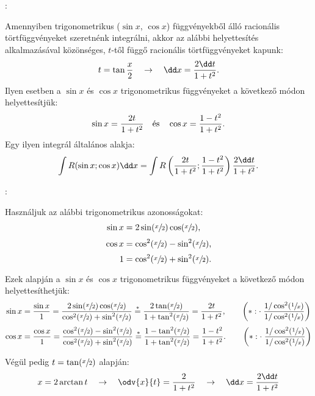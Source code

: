 \documentclass[a4paper, 12pt]{scrartcl}
\begin{document}
\begin{blueBox}
  :

  Amennyiben trigonometrikus ($\sin x$, $\cos x$) függvényekből álló racionális
  törtfüggvényeket szeretnénk integrálni, akkor az alábbi helyettesítés
  alkalmazásával közönséges, $t$-től függő racionális törtfüggvényeket kapunk:
  \[
    t = \tan \frac{x}{2}
    \quad \rightarrow \quad
    \dd x = \frac{2 \dd t}{1 + t^2}
    \text.
  \]
  Ilyen esetben a $\sin x$ és $\cos x$ trigonometrikus függvényeket a következő
  módon helyettesítjük:
  \[
    \sin x = \frac{2t}{1 + t^2}
    \quad \text{és} \quad
    \cos x = \frac{1 - t^2}{1 + t^2}
    \text.
  \]
  Egy ilyen integrál általános alakja:
  \[
    \int R(\sin x; \cos x) \dd x =
    \int R\left(
    \frac{2t}{1 + t^2}; \frac{1 - t^2}{1 + t^2}
    \right) \frac{2 \dd t}{1 + t^2}
    \text.
  \]
\end{blueBox}

\begin{note}
  :

  Használjuk az alábbi trigonometrikus azonosságokat:
  \begin{align*}
    \sin x & = 2 \sin (\sfrac{x}{2}) \cos (\sfrac{x}{2}) \text,     \\[1mm]
    \cos x & = \cos^2 (\sfrac{x}{2}) - \sin^2 (\sfrac{x}{2}) \text, \\[1mm]
    1      & = \cos^2 (\sfrac{x}{2}) + \sin^2 (\sfrac{x}{2}) \text.
  \end{align*}

  Ezek alapján a $\sin x$ és $\cos x$ trigonometrikus függvényeket a következő
  módon helyettesíthetjük:
  \begin{align*}
    \sin x & = \frac{\sin x}{1} = \frac{
      2 \sin (\sfrac{x}{2}) \cos (\sfrac{x}{2})
    }{
      \cos^2 (\sfrac{x}{2}) + \sin^2 (\sfrac{x}{2})
    } \stackrel{*}{=} \frac{
      2 \tan (\sfrac{x}{2})
    }{
      1 + \tan^2 (\sfrac{x}{2})
    } = \frac{
      2t
    }{
      1 + t^2
    }
    \text, \qquad \left(*: \cdot \; \frac{1/\cos^2(\sfrac{1}{x})}{1/\cos^2(\sfrac{1}{x})} \right)
    \\[1mm]
    \cos x & = \frac{\cos x}{1}= \frac{
      \cos^2 (\sfrac{x}{2}) - \sin^2 (\sfrac{x}{2})
    }{
      \cos^2 (\sfrac{x}{2}) + \sin^2 (\sfrac{x}{2})
    } \stackrel{*}{=} \frac{
      1 - \tan^2 (\sfrac{x}{2})
    }{
      1 + \tan^2 (\sfrac{x}{2})
    } = \frac{
      1 - t^2
    }{
      1 + t^2
    }
    \text. \qquad \left(*: \cdot \; \frac{1/\cos^2(\sfrac{1}{x})}{1/\cos^2(\sfrac{1}{x})} \right)
  \end{align*}

  Végül pedig $t = \tan (\sfrac{x}{2})$ alapján:
  \[
    x = 2 \arctan t
    \quad \rightarrow \quad
    \odv{x}{t} = \frac{2}{1 + t^2}
    \quad \rightarrow \quad
    \dd x = \frac{2 \dd t}{1 + t^2}
  \]
\end{note}
\end{document}
